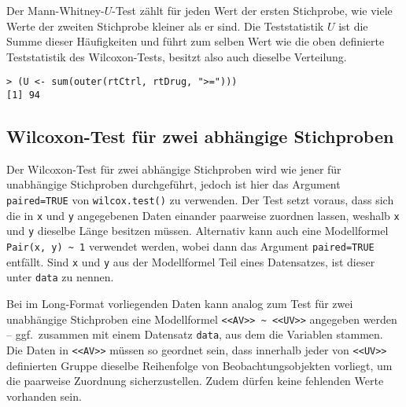 Der Mann-Whitney-$U$-Test zählt für jeden Wert der ersten Stichprobe, wie viele Werte der zweiten Stichprobe kleiner als er sind. Die Teststatistik $U$ ist die Summe dieser Häufigkeiten und führt zum selben Wert wie die oben definierte Teststatistik des Wilcoxon-Tests, besitzt also auch dieselbe Verteilung.
\begin{lstlisting}
> (U <- sum(outer(rtCtrl, rtDrug, ">=")))
[1] 94
\end{lstlisting}

\subsection{Wilcoxon-Test für zwei abhängige Stichproben}
\label{sec:wilcox_two_dep}

Der Wilcoxon-Test für zwei abhängige Stichproben wird wie jener für unabhängige Stichproben durchgeführt, jedoch ist hier das Argument \lstinline!paired=TRUE! von \lstinline!wilcox.test()! zu verwenden. Der Test setzt voraus, dass sich die in \lstinline!x! und \lstinline!y! angegebenen Daten einander paarweise zuordnen lassen, weshalb \lstinline!x! und \lstinline!y! dieselbe Länge besitzen müssen. Alternativ kann auch eine Modellformel \lstinline!Pair(x, y) ~ 1! verwendet werden, wobei dann das Argument \lstinline!paired=TRUE! entfällt. Sind \lstinline!x! und \lstinline!y! aus der Modellformel Teil eines Datensatzes, ist dieser unter \lstinline!data! zu nennen.

Bei im Long-Format vorliegenden Daten kann analog zum Test für zwei unabhängige Stichproben eine Modellformel \lstinline!<<AV>> ~ <<UV>>! angegeben werden -- ggf.\ zusammen mit einem Datensatz \lstinline!data!, aus dem die Variablen stammen. Die Daten in \lstinline!<<AV>>! müssen so geordnet sein, dass innerhalb jeder von \lstinline!<<UV>>! definierten Gruppe dieselbe Reihenfolge von Beobachtungsobjekten vorliegt, um die paarweise Zuordnung sicherzustellen. Zudem dürfen keine fehlenden Werte vorhanden sein.

